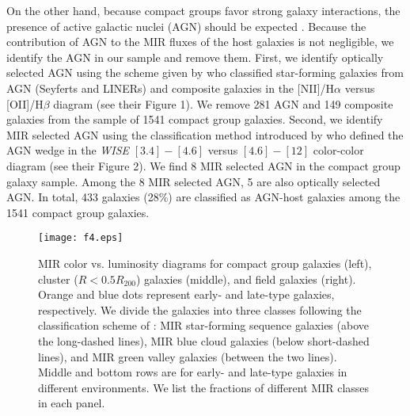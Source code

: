 \documentclass[12pt,preprint,apj]{emulateapj}
\newcommand{\rvir}{R_{200}}
\begin{document}
On the other hand, because compact groups favor strong galaxy interactions, 
the presence of active galactic nuclei (AGN) should be expected
\citep{coziol+98a,coziol+98b,martinez+10,tzanavaris+14}.
Because the contribution of AGN to the MIR fluxes 
of the host galaxies is not negligible, we identify the AGN in our sample 
and remove them.
First, we identify optically selected AGN using the scheme 
given by \citet{kewley+06} who classified star-forming galaxies from AGN 
(Seyferts and LINERs) and composite galaxies in the [NII]/H$\alpha$ versus [OII]/H$\beta$ diagram (see their Figure 1). We remove 281 AGN and 149 composite 
galaxies from the sample of 1541 compact group galaxies. 
Second, we identify MIR selected AGN using the classification method 
introduced by \citet{mateos+12} who defined the AGN wedge in the \textit{WISE} 
$[3.4]-[4.6]$ versus $[4.6]-[12]$ color-color diagram (see their Figure 2). 
We find 8 MIR selected AGN in the compact group galaxy sample. 
Among the 8 MIR selected AGN, 5 are also optically selected AGN. 
In total, 433 galaxies (28\%) are classified as AGN-host galaxies among the 1541 
compact group galaxies.


\begin{figure*}
\centering
\texttt{[image: f4.eps]}
\caption{MIR color vs. luminosity diagrams for compact group 
galaxies (left), cluster ($R<0.5\rvir$) galaxies (middle), 
and field galaxies (right). 
Orange and blue dots represent early- and late-type galaxies, respectively. 
We divide the galaxies into three classes following the classification scheme 
of \citet{lee+15}: MIR star-forming 
sequence galaxies (above the long-dashed lines), MIR blue cloud galaxies
(below short-dashed lines), and MIR green valley galaxies (between the two lines). 
Middle and bottom rows are for early- and late-type galaxies in 
different environments. We list the fractions of different MIR classes in each panel.
}
\label{mircld_env}
\end{figure*}

\end{document}

